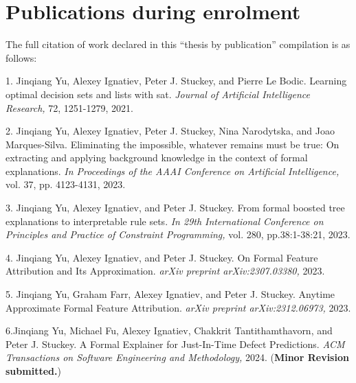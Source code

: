 

\section*{Publications during enrolment}

The full citation of work declared in this ``thesis by publication'' compilation is as follows:

{\large

1. Jinqiang Yu, Alexey Ignatiev, Peter J. Stuckey, and Pierre Le Bodic. Learning optimal decision
sets and lists with sat. \emph{Journal of Artificial Intelligence Research,} 72, 1251-1279, 2021.

2. Jinqiang Yu, Alexey Ignatiev, Peter J. Stuckey, Nina Narodytska, and Joao Marques-Silva.
Eliminating the impossible, whatever remains must be true: On extracting and applying background
knowledge in the context of formal explanations. \emph{In Proceedings of the AAAI Conference on Artificial
Intelligence,} vol. 37, pp. 4123-4131, 2023.

3. Jinqiang Yu, Alexey Ignatiev, and Peter J. Stuckey. From formal boosted tree explanations to
interpretable rule sets. \emph{In 29th International Conference on Principles and Practice of
	Constraint Programming,} vol. 280, pp.38:1-38:21, 2023.

4. Jinqiang Yu, Alexey Ignatiev, and Peter J. Stuckey. On Formal Feature Attribution and Its
Approximation. \emph{arXiv preprint arXiv:2307.03380,} 2023.

5. Jinqiang Yu, Graham Farr, Alexey Ignatiev, and Peter J. Stuckey. Anytime Approximate Formal
Feature Attribution. \emph{arXiv preprint arXiv:2312.06973,} 2023.

6.Jinqiang Yu, Michael Fu, Alexey Ignatiev, Chakkrit Tantithamthavorn, and Peter J. Stuckey. A
Formal Explainer for Just-In-Time Defect Predictions. \emph{ACM Transactions on Software Engineering
	and Methodology,} 2024. (\textbf{Minor Revision submitted.})
}
